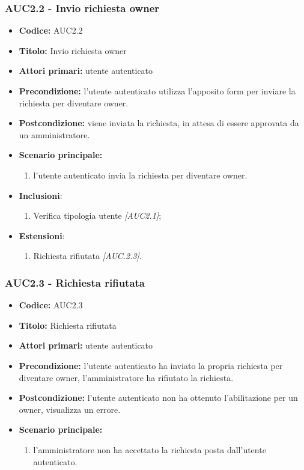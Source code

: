 \documentclass[casi-duso]{subfiles}
\begin{document}
\subsubsection{AUC2.2 - Invio richiesta owner}%
\label{subsub:AUC2.2}
\begin{itemize}
  \item \textbf{Codice:} AUC2.2
  \item \textbf{Titolo:} Invio richiesta owner
  \item \textbf{Attori primari:} utente autenticato
  \item \textbf{Precondizione:} l'utente autenticato utilizza l'apposito form per inviare la richiesta per diventare owner.
  \item \textbf{Postcondizione:} viene inviata la richiesta, in attesa di essere approvata da un amministratore.
  \item \textbf{Scenario principale:}
  \begin{enumerate}
    \item l'utente autenticato invia la richiesta per diventare owner.
  \end{enumerate}
  \item \textbf{Inclusioni}:
  \begin{enumerate}
    \item Verifica tipologia utente \emph{[AUC2.1]};
  \end{enumerate}
  \item \textbf{Estensioni}:
  \begin{enumerate}
    \item Richiesta rifiutata \emph{[AUC.2.3]}.
  \end{enumerate}
\end{itemize}

\subsubsection{AUC2.3 - Richiesta rifiutata}%
\label{subsub:AUC2.3}
\begin{itemize}
  \item \textbf{Codice:} AUC2.3
  \item \textbf{Titolo:} Richiesta rifiutata
  \item \textbf{Attori primari:} utente autenticato
  \item \textbf{Precondizione:} l'utente autenticato ha inviato la propria richiesta per diventare owner, l'amministratore ha rifiutato la richiesta.
  \item \textbf{Postcondizione:} l'utente autenticato non ha ottenuto l'abilitazione per un owner, visualizza un errore.
  \item \textbf{Scenario principale:}
  \begin{enumerate}
    \item l'amministratore non ha accettato la richiesta posta dall'utente autenticato.
  \end{enumerate}
\end{itemize}
\end{document}

